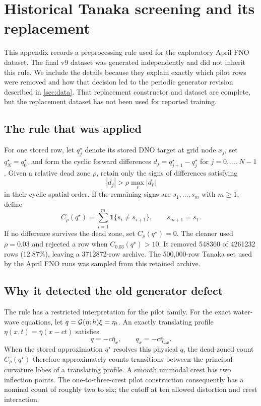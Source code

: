 \section{Historical Tanaka screening and its replacement}
\label{app:historical-cleaning}

This appendix records a preprocessing rule used for the exploratory April FNO
dataset.  The final v9 dataset was generated independently and did not inherit
this rule.  We include the details because they explain exactly which pilot
rows were removed and how that decision led to the periodic generator revision
described in \cref{sec:data}.  That replacement constructor and dataset are
complete, but the replacement dataset has not been used for reported training.

\subsection{The rule that was applied}

For one stored row, let $q^\star_j$ denote its stored DNO target at grid node
$x_j$, set $q^\star_N=q^\star_0$, and form the cyclic forward differences
$d_j=q^\star_{j+1}-q^\star_j$ for $j=0,\ldots,N-1$.  Given a relative dead
zone $\rho$, retain only the signs of differences satisfying
\begin{equation}
  |d_j|>\rho\max_\ell|d_\ell|
\end{equation}
in their cyclic spatial order.  If the remaining signs are
$s_1,\ldots,s_m$ with \(m\geq1\), define
\begin{equation}
  C_\rho(q^\star)=\sum_{i=1}^{m}\mathbf 1\{s_i\ne s_{i+1}\},
  \qquad s_{m+1}=s_1.
  \label{eq:historical-sign-count}
\end{equation}
If no difference survives the dead zone, set \(C_\rho(q^\star)=0\).
The cleaner used $\rho=0.03$ and rejected a row when
$C_{0.03}(q^\star)>10$.  It removed \num{548360} of \num{4261232} rows
($12.87\%$), leaving a \num{3712872}-row archive.  The 500,000-row Tanaka set
used by the April FNO runs was sampled from this retained archive.

\subsection{Why it detected the old generator defect}

The rule has a restricted interpretation for the pilot family.  For the
exact water-wave equations, let
$q=\mathcal{G}(\eta;h)\xi=\eta_t$.  An exactly translating profile
$\eta(x,t)=\bar\eta(x-ct)$ satisfies
\begin{equation}
  q=-c\bar\eta_x,
  \qquad q_x=-c\bar\eta_{xx}.
  \label{eq:traveling-curvature-count}
\end{equation}
When the stored approximation $q^\star$ resolves this physical $q$, the
dead-zoned count $C_\rho(q^\star)$ therefore approximately counts transitions
between the principal curvature lobes of a translating profile.  A smooth
unimodal crest has two inflection points.  The one-to-three-crest pilot
construction consequently has a nominal count of roughly two to six; the
cutoff at ten allowed distortion and crest interaction.

